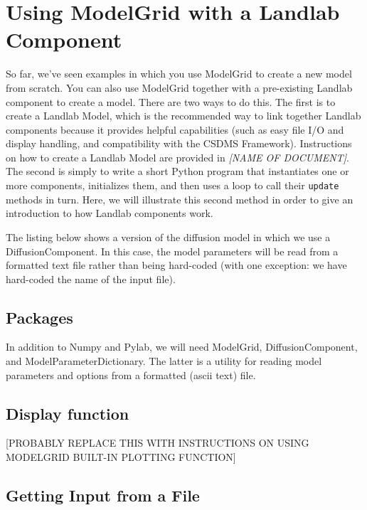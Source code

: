 \documentclass[12pt]{article}
\newcommand{\code}[1]{{\tt #1}}
\begin{document}

\section{Using ModelGrid with a Landlab Component}

So far, we've seen examples in which you use ModelGrid to create a new model from scratch. You can also use ModelGrid together with a pre-existing Landlab component to create a model. There are two ways to do this. The first is to create a Landlab Model, which is the recommended way to link together Landlab components because it provides helpful capabilities (such as easy file I/O and display handling, and compatibility with the CSDMS Framework). Instructions on how to create a Landlab Model are provided in {\em [NAME OF DOCUMENT]}. The second is simply to write a short Python program that instantiates one or more components, initializes them, and then uses a loop to call their \code{update} methods in turn. Here, we will illustrate this second method in order to give an introduction to how Landlab components work.

The listing below shows a version of the diffusion model in which we use a DiffusionComponent. In this case, the model parameters will be read from a formatted text file rather than being hard-coded (with one exception: we have hard-coded the name of the input file).

 

\subsection{Packages}

 

In addition to Numpy and Pylab, we will need ModelGrid, DiffusionComponent, and ModelParameterDictionary. The latter is a utility for reading model parameters and options from a formatted (ascii text) file.

\subsection{Display function}

[PROBABLY REPLACE THIS WITH INSTRUCTIONS ON USING MODELGRID BUILT-IN PLOTTING FUNCTION]

\subsection{Getting Input from a File}
\end{document}
